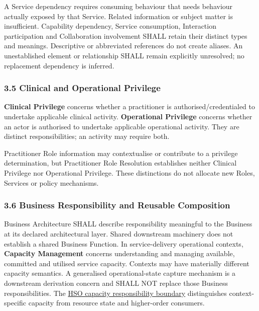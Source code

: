 \label{rad:metamodel:159}

A Service dependency requires consuming behaviour that needs behaviour actually exposed by that Service. Related information or subject matter is insufficient. Capability dependency, Service consumption, Interaction participation and Collaboration involvement SHALL retain their distinct types and meanings. Descriptive or abbreviated references do not create aliases. An unestablished element or relationship SHALL remain explicitly unresolved; no replacement dependency is inferred.

\label{rad:metamodel:161}
\subsubsection*{3.5 Clinical and Operational Privilege}
\label{rad:metamodel:163}

\textbf{Clinical Privilege} concerns whether a practitioner is authorised/\allowbreak{}credentialed to undertake applicable clinical activity. \textbf{Operational Privilege} concerns whether an actor is authorised to undertake applicable operational activity. They are distinct responsibilities; an activity may require both.

\label{rad:metamodel:165}

Practitioner Role information may contextualise or contribute to a privilege determination, but Practitioner Role Resolution establishes neither Clinical Privilege nor Operational Privilege. These distinctions do not allocate new Roles, Services or policy mechanisms.

\label{rad:metamodel:167}
\subsubsection*{3.6 Business Responsibility and Reusable Composition}
\label{rad:metamodel:169}

Business Architecture SHALL describe responsibility meaningful to the Business at its declared architectural layer. Shared downstream machinery does not establish a shared Business Function. In service-delivery operational contexts, \textbf{Capacity Management} concerns understanding and managing available, committed and utilised service capacity. Contexts may have materially different capacity semantics. A generalised operational-state capture mechanism is a downstream derivation concern and SHALL NOT replace those Business responsibilities. The \hyperref[rad:hso:18]{HSO capacity responsibility boundary} distinguishes context-specific capacity from resource state and higher-order consumers.

